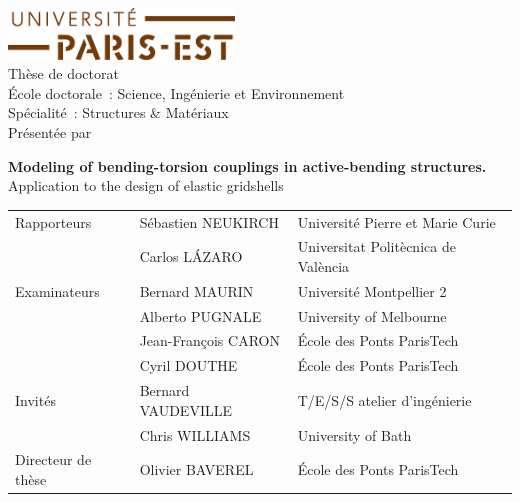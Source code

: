 \begin{titlepage}
\begin{center}

\includegraphics[width=6cm]{head/logo_upe}\\
\vspace{2cm}
{\Large Thèse de doctorat} \\
{\large École doctorale~: Science, Ingénierie et Environnement}\\
{\large Spécialité~: Structures \& Matériaux}\\
\vspace{18pt}
{\Large Présentée par}\\
{\large \myauthor}

\vfill

{\ttfamily
{\bfseries\huge  Modeling of bending-torsion couplings in active-bending structures.}
\\\vspace{12pt}
{\Large Application to the design of elastic gridshells}
}

\vfill

{\setlength{\tabcolsep}{0.5cm}
\begin{tabular}{@{}>{}lll@{}}

Rapporteurs 		& Sébastien NEUKIRCH 		& Université Pierre et Marie Curie\\
 				& Carlos LÁZARO 			& Universitat Politècnica de València\\
\addlinespace
Examinateurs		& Bernard MAURIN 			& Université Montpellier 2\\
 				& Alberto PUGNALE 		& University of Melbourne\\
 				& Jean-François CARON 		& École des Ponts ParisTech\\
 				& Cyril DOUTHE 			& École des Ponts ParisTech\\
\addlinespace
Invités 			& Bernard VAUDEVILLE 		& T/E/S/S atelier d'ingénierie\\
 				& Chris WILLIAMS 			& University of Bath\\
\addlinespace
Directeur de thèse 	& Olivier BAVEREL 			& École des Ponts ParisTech\\
\end{tabular}}

\end{center}
\end{titlepage}




